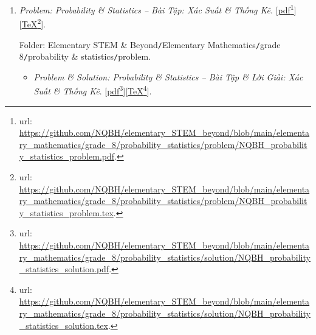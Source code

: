 \documentclass[12pt,oneside]{book}
\begin{document}
\begin{enumerate}
	Folder: {\sf Elementary STEM \& Beyond{\tt/}Elementary Mathematics{\tt/}grade 8{\tt/}triangle quadrilateral{\tt/}problem}.
	\begin{itemize}
		\item {\it Problem \& Solution: Triangles \& Quadrilaterals -- Bài Tập \& Lời Giải: Tam Giác \& Tứ Giác}. [\href{https://github.com/NQBH/elementary_STEM_beyond/blob/main/elementary_mathematics/grade_8/triangle_quadrilateral/solution/NQBH_triangle_quadrilateral_solution.pdf}{pdf}\footnote{{\sc url}: \url{https://github.com/NQBH/elementary_STEM_beyond/blob/main/elementary_mathematics/grade_8/triangle_quadrilateral/solution/NQBH_triangle_quadrilateral_solution.pdf}.}][\href{https://github.com/NQBH/elementary_STEM_beyond/blob/main/elementary_mathematics/grade_8/triangle_quadrilateral/solution/NQBH_triangle_quadrilateral_solution.tex}{\TeX}\footnote{{\sc url}: \url{https://github.com/NQBH/elementary_STEM_beyond/blob/main/elementary_mathematics/grade_8/triangle_quadrilateral/solution/NQBH_triangle_quadrilateral_solution.tex}.}].
		
		Folder: {\sf Elementary STEM \& Beyond{\tt/}Elementary Mathematics{\tt/}grade 8{\tt/}triangle quadrilateral{\tt/}solution}.
	\end{itemize}
	\item {\it Problem: Probability \& Statistics -- Bài Tập: Xác Suất \& Thống Kê}. [\href{https://github.com/NQBH/elementary_STEM_beyond/blob/main/elementary_mathematics/grade_8/probability_statistics/problem/NQBH_probability_statistics_problem.pdf}{pdf}\footnote{{\sc url}: \url{https://github.com/NQBH/elementary_STEM_beyond/blob/main/elementary_mathematics/grade_8/probability_statistics/problem/NQBH_probability_statistics_problem.pdf}.}][\href{https://github.com/NQBH/elementary_STEM_beyond/blob/main/elementary_mathematics/grade_8/probability_statistics/problem/NQBH_probability_statistics_problem.tex}{\TeX}\footnote{{\sc url}: \url{https://github.com/NQBH/elementary_STEM_beyond/blob/main/elementary_mathematics/grade_8/probability_statistics/problem/NQBH_probability_statistics_problem.tex}.}].
	
	Folder: {\sf Elementary STEM \& Beyond{\tt/}Elementary Mathematics{\tt/}grade 8{\tt/}probability \& statistics{\tt/}problem}.
	\begin{itemize}
		\item {\it Problem \& Solution: Probability \& Statistics -- Bài Tập \& Lời Giải: Xác Suất \& Thống Kê}. [\href{https://github.com/NQBH/elementary_STEM_beyond/blob/main/elementary_mathematics/grade_8/probability_statistics/solution/NQBH_probability_statistics_solution.pdf}{pdf}\footnote{{\sc url}: \url{https://github.com/NQBH/elementary_STEM_beyond/blob/main/elementary_mathematics/grade_8/probability_statistics/solution/NQBH_probability_statistics_solution.pdf}.}][\href{https://github.com/NQBH/elementary_STEM_beyond/blob/main/elementary_mathematics/grade_8/probability_statistics/solution/NQBH_probability_statistics_solution.tex}{\TeX}\footnote{{\sc url}: \url{https://github.com/NQBH/elementary_STEM_beyond/blob/main/elementary_mathematics/grade_8/probability_statistics/solution/NQBH_probability_statistics_solution.tex}.}].
		

\end{itemize}
\end{enumerate}
\end{document}
